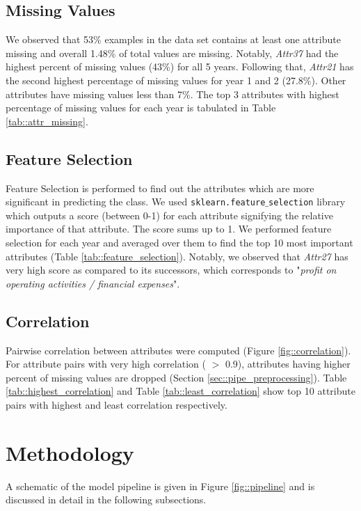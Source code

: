 \documentclass[11pt,a4paper]{article}
\begin{document}

\subsection{Missing Values}
\label{sec::missing_vals}
We observed that 53\% examples in the data set contains at least one attribute missing and overall 1.48\% of total values are missing. Notably, \textit{Attr37} had the highest percent of missing values (43\%) for all 5 years. Following that, \textit{Attr21} has the second highest percentage of missing values for year 1 and 2 (27.8\%). Other attributes have missing values less than 7\%.
The top 3 attributes with highest percentage of missing values for each year is tabulated in Table \ref{tab::attr_missing}.



\subsection{Feature Selection}
Feature Selection is performed to find out the attributes which are more significant in predicting the class. We used \texttt{sklearn.feature$\_$selection} library which outputs a score (between 0-1) for each attribute signifying the relative importance of that attribute. The score sums up to 1. We performed feature selection for each year and averaged over them to find the top 10 most important attributes (Table \ref{tab::feature_selection}). Notably, we observed that \textit{Attr27} has very high score as compared to its successors, which corresponds to "\textit{profit on operating activities / financial expenses}".



\subsection{Correlation}
Pairwise correlation between attributes were computed (Figure 
\ref{fig::correlation}). For attribute pairs with very high correlation ( $>$ 0.9), attributes having higher percent of missing values are dropped (Section \ref{sec::pipe_preprocessing}).
Table \ref{tab::highest_correlation} and Table \ref{tab::least_correlation} show top 10 attribute pairs with highest and least correlation respectively.
\\


\label{sec::correlation}

\section{Methodology}
\label{sec::methodology}
A schematic of the model pipeline is given in Figure \ref{fig::pipeline} and is discussed in detail in the following subsections.
\end{document}
